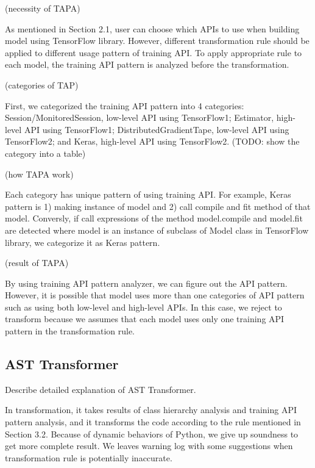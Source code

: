 (necessity of TAPA)

As mentioned in Section 2.1, user can choose which APIs to use
when building model using TensorFlow library.
However, different transformation rule should be applied
to different usage pattern of training API.
To apply appropriate rule to each model,
the training API pattern is analyzed before the transformation.

(categories of TAP)

First, we categorized the training API pattern into 4 categories:
Session/MonitoredSession, low-level API using TensorFlow1;
Estimator, high-level API using TensorFlow1;
DistributedGradientTape, low-level API using TensorFlow2;
and Keras, high-level API using TensorFlow2.
(TODO: show the category into a table)

(how TAPA work)

Each category has unique pattern of using training API.
For example, Keras pattern is 1) making instance of model and
2) call compile and fit method of that model.
Conversly, if call expressions of the method model.compile and model.fit are detected
where model is an instance of subclass of Model class in TensorFlow library,
we categorize it as Keras pattern.

(result of TAPA)

By using training API pattern analyzer, we can figure out the API pattern.
However, it is possible that model uses more than one categories of API pattern
such as using both low-level and high-level APIs.
In this case, we reject to transform because we assumes
that each model uses only one training API pattern in the transformation rule.

\subsection{AST Transformer}
Describe detailed explanation of AST Transformer.

In transformation, it takes results of class hierarchy analysis
and training API pattern analysis, and it transforms the code
according to the rule mentioned in Section 3.2.
Because of dynamic behaviors of Python, we give up soundness
to get more complete result.
We leaves warning log with some suggestions
when transformation rule is potentially inaccurate.

